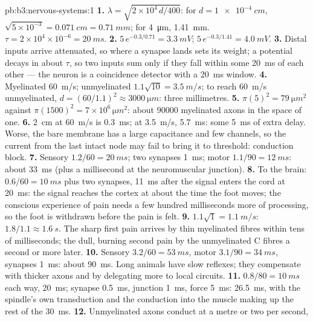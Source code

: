 \begin{solution}{pb:b3:nervous-systems:1}
\textbf{1.} $\lambda = \sqrt{2\times 10^{4}\,d/400}$: for $d =
\qty{1e-4}{cm}$, $\sqrt{5\times 10^{-3}} = \qty{0.071}{cm} =
\qty{0.71}{mm}$; for \qty{4}{\micro m}, \qty{1.41}{mm}. $\tau = 2\times
10^{4}\times 10^{-6} = \qty{20}{ms}$.
\textbf{2.} $5\,e^{-0.3/0.71} = \qty{3.3}{mV}$; $5\,e^{-0.3/1.41} =
\qty{4.0}{mV}$.
\textbf{3.} Distal inputs arrive attenuated, so where a synapse lands
sets its weight; a potential decays in about $\tau$, so two inputs sum
only if they fall within some \qty{20}{ms} of each other --- the neuron
is a coincidence detector with a \qty{20}{ms} window.
\textbf{4.} Myelinated \qty{60}{m/s}; unmyelinated $1.1\sqrt{10} =
\qty{3.5}{m/s}$; to reach \qty{60}{m/s} unmyelinated, $d = (60/1.1)^{2}
\approx \qty{3000}{\micro m}$: three millimetres.
\textbf{5.} $\pi(5)^{2} = \qty{79}{\micro m^2}$ against $\pi(1500)^{2} =
7\times 10^{6}\,\unit{\micro m^2}$: about \num{90000} myelinated axons
in the space of one.
\textbf{6.} \qty{2}{cm} at \qty{60}{m/s} is \qty{0.3}{ms}; at
\qty{3.5}{m/s}, \qty{5.7}{ms}: some \qty{5}{ms} of extra delay. Worse,
the bare membrane has a large capacitance and few channels, so the
current from the last intact node may fail to bring it to threshold:
conduction block.
\textbf{7.} Sensory $1.2/60 = \qty{20}{ms}$; two synapses \qty{1}{ms};
motor $1.1/90 = \qty{12}{ms}$: about \qty{33}{ms} (plus a millisecond
at the neuromuscular junction).
\textbf{8.} To the brain: $0.6/60 = \qty{10}{ms}$ plus two synapses,
\qty{11}{ms} after the signal enters the cord at \qty{20}{ms}: the
signal reaches the cortex at about the time the foot moves; the
conscious experience of pain needs a few hundred milliseconds more of
processing, so the foot is withdrawn before the pain is felt.
\textbf{9.} $1.1\sqrt{1} = \qty{1.1}{m/s}$: $1.8/1.1 \approx
\qty{1.6}{s}$. The sharp first pain arrives by thin myelinated fibres
within tens of milliseconds; the dull, burning second pain by the
unmyelinated C fibres a second or more later.
\textbf{10.} Sensory $3.2/60 = \qty{53}{ms}$, motor $3.1/90 =
\qty{34}{ms}$, synapses \qty{1}{ms}: about \qty{90}{ms}. Long animals
have slow reflexes; they compensate with thicker axons and by
delegating more to local circuits.
\textbf{11.} $0.8/80 = \qty{10}{ms}$ each way, \qty{20}{ms}; synapse
\qty{0.5}{ms}, junction \qty{1}{ms}, force \qty{5}{ms}: \qty{26.5}{ms},
with the spindle's own transduction and the conduction into the muscle
making up the rest of the \qty{30}{ms}.
\textbf{12.} Unmyelinated axons conduct at a metre or two per second,

\end{solution}
